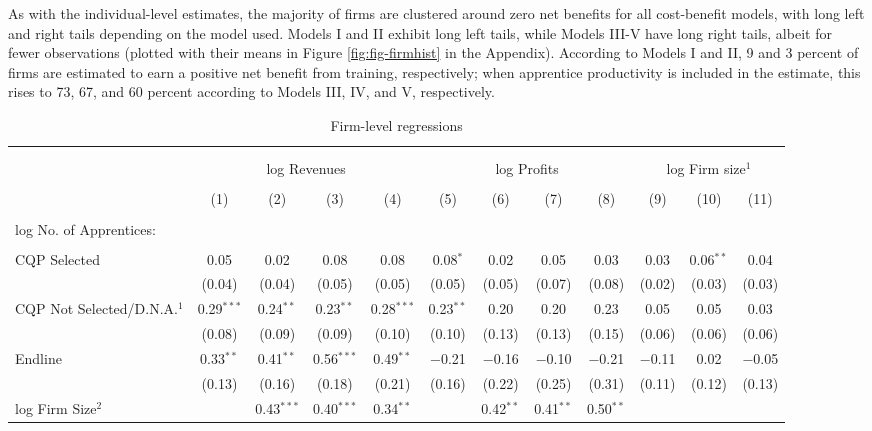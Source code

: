 \documentclass[
  a4paper, twoside, 12pt]{book}
\begin{document}
As with the individual-level estimates, the majority of firms are clustered around zero net benefits for all cost-benefit models, with long left and right tails depending on the model used. Models I and II exhibit long left tails, while Models III-V have long right tails, albeit for fewer observations (plotted with their means in Figure \ref{fig:fig-firmhist} in the Appendix). According to Models I and II, 9 and 3 percent of firms are estimated to earn a positive net benefit from training, respectively; when apprentice productivity is included in the estimate, this rises to 73, 67, and 60 percent according to Models III, IV, and V, respectively.

\begin{table}[H] \centering 
  \caption{Firm-level regressions} 
  \label{tab:tbl-firmregs} 
\scriptsize 
\begin{tabular}{@{\extracolsep{-8pt}}lccccccccccc} 
\\[-1.8ex]\hline 
\hline \\[-1.8ex] 
\\[-1.8ex] & \multicolumn{4}{c}{log Revenues} & \multicolumn{4}{c}{log Profits} & \multicolumn{3}{c}{log Firm size$^1$} \\ 
\\[-1.8ex] & (1) & (2) & (3) & (4) & (5) & (6) & (7) & (8) & (9) & (10) & (11)\\ 
\hline \\[-1.8ex] 
 log No. of Apprentices: \\ \\
                               \quad CQP Selected & 0.05 & 0.02 & 0.08 & 0.08 & 0.08$^{*}$ & 0.02 & 0.05 & 0.03 & 0.03 & 0.06$^{**}$ & 0.04 \\ 
  & (0.04) & (0.04) & (0.05) & (0.05) & (0.05) & (0.05) & (0.07) & (0.08) & (0.02) & (0.03) & (0.03) \\ 
  \quad CQP Not Selected/D.N.A.$^1$ & 0.29$^{***}$ & 0.24$^{**}$ & 0.23$^{**}$ & 0.28$^{***}$ & 0.23$^{**}$ & 0.20 & 0.20 & 0.23 & 0.05 & 0.05 & 0.03 \\ 
  & (0.08) & (0.09) & (0.09) & (0.10) & (0.10) & (0.13) & (0.13) & (0.15) & (0.06) & (0.06) & (0.06) \\ 
  Endline & 0.33$^{**}$ & 0.41$^{**}$ & 0.56$^{***}$ & 0.49$^{**}$ & $-$0.21 & $-$0.16 & $-$0.10 & $-$0.21 & $-$0.11 & 0.02 & $-$0.05 \\ 
  & (0.13) & (0.16) & (0.18) & (0.21) & (0.16) & (0.22) & (0.25) & (0.31) & (0.11) & (0.12) & (0.13) \\ 
  log Firm Size$^2$ &  & 0.43$^{***}$ & 0.40$^{***}$ & 0.34$^{**}$ &  & 0.42$^{**}$ & 0.41$^{**}$ & 0.50$^{**}$ &  &  &  \\ 

\end{tabular}
\end{table}
\end{document}
